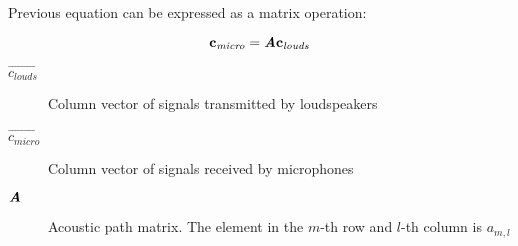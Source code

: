 Previous equation can be expressed as a matrix operation:

\begin{equation}
\mathbf{c_\mathit{micro}} = \bm{\mathit{A}} \mathbf{c_\mathit{louds}}
\label{transEqMatrix}
\end{equation}

\begin{description}
	\item[$\vec{c_\mathit{louds}}$] Column vector of signals transmitted by loudspeakers
 	\item[$\vec{c_\mathit{micro}}$] Column vector of signals received by microphones
	\item[$\bm{\mathit{A}}$] Acoustic path matrix. The element in the $m$-th row and $l$-th column is $a_{m,l}$
\end{description}




